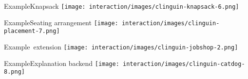\begin{frame}[c]{Example}{Knapsack}
  \centering
  \texttt{[image: interaction/images/clinguin-knapsack-6.png]}
\end{frame}
\begin{frame}[c]{Example}{Seating arrangement}
  \centering
  \texttt{[image: interaction/images/clinguin-placement-7.png]}%
\end{frame}
\begin{frame}[c]{Example}{\clingodl\ extension}
\centering
\texttt{[image: interaction/images/clinguin-jobshop-2.png]}%
\end{frame}
\begin{frame}[c]{Example}{Explanation backend}
\centering
\texttt{[image: interaction/images/clinguin-catdog-8.png]}%
\end{frame}
